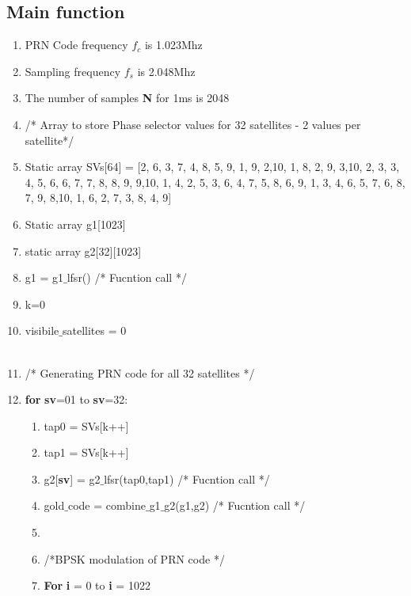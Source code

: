 \documentclass[journal,10pt,onecolumn]{article}
\begin{document}
\subsection{Main function}
\begin{enumerate}

\item PRN Code frequency $f_c$ is 1.023Mhz
\item Sampling frequency $f_s$ is 2.048Mhz
\item The number of samples \textbf{N} for 1ms is 2048 
    \item[] /* Array to store Phase selector values for 32 satellites - 2 values per satellite*/
    \item Static array SVs[64] = [2, 6,
    3, 7,
    4, 8,
    5, 9,
    1, 9,
    2,10,
    1, 8,
    2, 9,
    3,10,
    2, 3,
    3, 4,
    5, 6,
    6, 7,
    7, 8,
    8, 9,
    9,10,
    1, 4,
    2, 5,
    3, 6,
    4, 7,
    5, 8, 
    6, 9,
    1, 3,
    4, 6,
    5, 7, 
    6, 8,
    7, 9,
    8,10,
    1, 6,
    2, 7,
    3, 8,
    4, 9]
    \item Static array g1[1023]
    \item static array g2[32][1023]
    \item g1 =  g1$\_$lfsr()  /* Fucntion call */
    \item k=0
    \item visibile$\_$satellites = 0 \\ \\
    \item[] /* Generating PRN code for all 32 satellites  */
	\item \textbf{for} \textbf{sv}=01 to \textbf{sv}=32: 
	
	\begin{enumerate}
    \renewcommand{\labelenumii}{\roman{enumii}}
        \item[] tap0 = SVs[k++]
        \item[] tap1 = SVs[k++]
        \item[] g2[\textbf{sv}] = g2$\_$lfsr(tap0,tap1)   /* Fucntion call */
        \item[] gold$\_$code = combine$\_$g1$\_$g2(g1,g2)  /* Fucntion call */
        \item[] \item[] /*BPSK modulation of PRN code */
        \item[] \textbf{For} \textbf{i} = 0 to \textbf{i} = 1022
        

\end{enumerate}
\end{enumerate}
\end{document}
